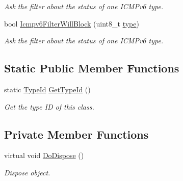 \begin{DoxyCompactItemize}
\begin{DoxyCompactList}\small\item\em Ask the filter about the status of one I\+C\+M\+Pv6 type. \end{DoxyCompactList}\item 
bool \hyperlink{classns3_1_1Ipv6RawSocketImpl_a033c506bc14bddc3f9ef47bc71efa328}{Icmpv6\+Filter\+Will\+Block} (uint8\+\_\+t \hyperlink{visualizer-ideas_8txt_add98db9e15e2a58cf2b57623e7aa893a}{type})
\begin{DoxyCompactList}\small\item\em Ask the filter about the status of one I\+C\+M\+Pv6 type. \end{DoxyCompactList}\end{DoxyCompactItemize}
\subsection*{Static Public Member Functions}
\begin{DoxyCompactItemize}
\item 
static \hyperlink{classns3_1_1TypeId}{Type\+Id} \hyperlink{classns3_1_1Ipv6RawSocketImpl_a5f950ca300c163fd1b3276668f77be47}{Get\+Type\+Id} ()
\begin{DoxyCompactList}\small\item\em Get the type ID of this class. \end{DoxyCompactList}\end{DoxyCompactItemize}
\subsection*{Private Member Functions}
\begin{DoxyCompactItemize}
\item 
virtual void \hyperlink{classns3_1_1Ipv6RawSocketImpl_a34d6a77e528c452f79a4feb25925b17e}{Do\+Dispose} ()
\begin{DoxyCompactList}\small\item\em Dispose object. \end{DoxyCompactList}\end{DoxyCompactItemize}
